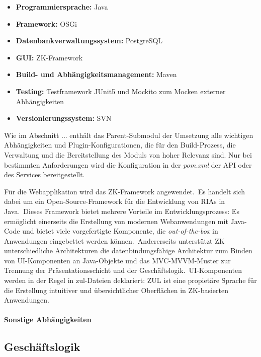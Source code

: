 \begin{itemize}
	\item \textbf{Programmiersprache:} Java
	\item \textbf{Framework:} OSGi
	\item \textbf{Datenbankverwaltungssystem:} PostgreSQL
	\item \textbf{GUI:} ZK-Framework
	\item \textbf{Build- und Abhängigkeitsmanagement:} Maven
	\item \textbf{Testing:} Testframework JUnit5 und Mockito zum Mocken externer Abhängigkeiten
	\item \textbf{Versionierungssystem:} SVN
\end{itemize}

Wie im Abschnitt ... enthält das Parent-Submodul der Umsetzung alle wichtigen Abhängigkeiten und Plugin-Konfigurationen, die für den Build-Prozess, die Verwaltung und die Bereitstellung des Moduls von hoher Relevanz sind.
Nur bei bestimmten Anforderungen wird die Konfiguration in der \textit{pom.xml} der API oder des Services bereitgestellt.

Für die Webapplikation wird das ZK-Framework angewendet.\ Es handelt sich dabei um ein Open-Source-Framework für die Entwicklung von RIAs in Java.\ Dieses Framework bietet mehrere Vorteile im Entwicklungsprozess: Es ermöglicht
einerseits die Erstellung von modernen Webanwendungen mit Java-Code und bietet viele vorgefertigte Komponente, die \textit{out-of-the-box} in Anwendungen eingebettet werden können.\ Andererseits unterstützt ZK unterschiedliche
Architekturen \zB die datenbindungsfähige Architektur zum Binden von UI-Komponenten an Java-Objekte und das MVC-\bzw MVVM-Muster zur Trennung der Präsentationsschicht und der Geschäftslogik.\ UI-Komponenten werden in der Regel in
zul-Dateien deklariert: ZUL ist eine propietäre Sprache für die Erstellung intuitiver und übersichtlicher Oberflächen in ZK-basierten Anwendungen.

\paragraph{Sonstige Abhängigkeiten}
\label{par:Abhaengigkeiten}





\subsection{Geschäftslogik}
\label{sec:Geschaeftslogik}

